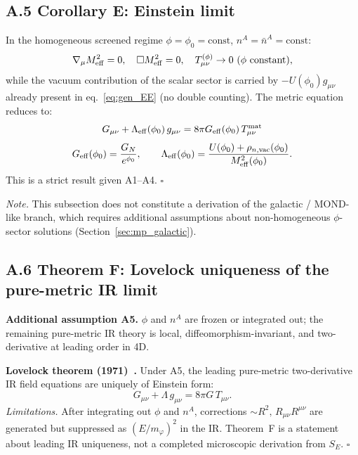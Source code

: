\documentclass[11pt,a4paper]{article}
\numberwithin{equation}{section}
\begin{document}
\subsection*{A.5 Corollary E: Einstein limit}

In the homogeneous screened regime
$\phi=\phi_0=\mathrm{const}$, $n^A=\bar{n}^A=\mathrm{const}$:
\begin{equation}
  \nabla_\mu M^2_{\rm eff}=0,\quad
  \Box M^2_{\rm eff}=0,\quad
  T^{(\phi)}_{\mu\nu}\to 0\ (\phi\ \text{constant}),
\end{equation}
while the vacuum contribution of the scalar sector is carried by
$-U(\phi_0)g_{\mu\nu}$ already present in eq.~\eqref{eq:gen_EE}
(no double counting). The metric equation reduces to:
\begin{equation}
  G_{\mu\nu} + \Lambda_{\rm eff}(\phi_0)\,g_{\mu\nu}
  = 8\pi G_{\rm eff}(\phi_0)\,T^{\rm mat}_{\mu\nu}
  \label{eq:Einstein_limit}
\end{equation}
\begin{equation}
  G_{\rm eff}(\phi_0) = \frac{G_N}{e^{\phi_0}},\qquad
  \Lambda_{\rm eff}(\phi_0)
  = \frac{U(\phi_0)+\rho_{n,{\rm vac}}(\phi_0)}{M^2_{\rm eff}(\phi_0)}.
\end{equation}
This is a strict result given A1--A4. $\square$

\textit{Note.} This subsection does not constitute a derivation of
the galactic / MOND-like branch, which requires additional assumptions
about non-homogeneous $\phi$-sector solutions
(Section~\ref{sec:mp_galactic}).

\subsection*{A.6 Theorem F: Lovelock uniqueness of the pure-metric IR limit}

\textbf{Additional assumption A5.}
$\phi$ and $n^A$ are frozen or integrated out; the remaining
pure-metric IR theory is local, diffeomorphism-invariant, and
two-derivative at leading order in 4D.

\textbf{Lovelock theorem (1971)~\cite{Lovelock1971}.}
Under A5, the leading pure-metric two-derivative IR field equations
are uniquely of Einstein form:
\begin{equation}
  G_{\mu\nu} + \Lambda\,g_{\mu\nu} = 8\pi G\,T_{\mu\nu}.
  \label{eq:Lovelock_EFE}
\end{equation}
\textit{Limitations.} After integrating out $\phi$ and $n^A$,
corrections $\sim R^2,\,R_{\mu\nu}R^{\mu\nu}$ are generated
but suppressed as $(E/m_\varphi)^2$ in the IR.
Theorem~F is a statement about leading IR uniqueness,
not a completed microscopic derivation from $S_E$. $\square$
\end{document}
